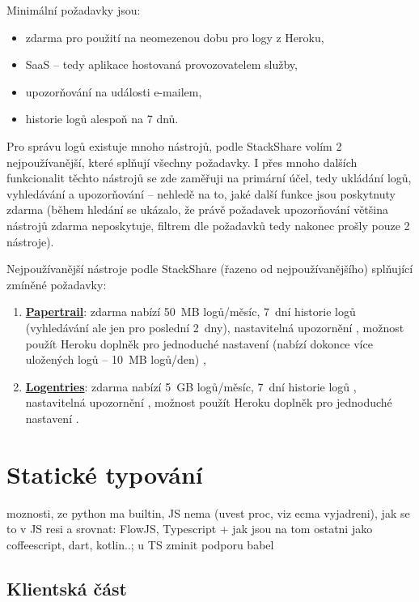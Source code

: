 Minimální požadavky jsou:
\begin{itemize}
    \item zdarma pro použití na neomezenou dobu pro logy z Heroku,
    \item SaaS -- tedy aplikace hostovaná provozovatelem služby,
    \item upozorňování na události e-mailem,
    \item historie logů alespoň na 7 dnů.
\end{itemize}

Pro správu logů existuje mnoho nástrojů, podle StackShare \cite{stackshare-log} volím 2 nejpoužívanější, které splňují všechny požadavky. I přes mnoho dalších funkcionalit těchto nástrojů se zde zaměřuji na primární účel, tedy ukládání logů, vyhledávání a upozorňování -- nehledě na to, jaké další funkce jsou poskytnuty zdarma (během hledání se ukázalo, že právě požadavek upozorňování většina nástrojů zdarma neposkytuje, filtrem dle požadavků tedy nakonec prošly pouze 2 nástroje).

Nejpoužívanější nástroje podle StackShare (řazeno od nejpoužívanějšího) \cite{stackshare-log} splňující zmíněné požadavky:
\begin{enumerate}
    \item \href{https://www.papertrail.com/}{\textbf{Papertrail}}: zdarma nabízí 50~MB logů/měsíc, 7~dní historie logů (vyhledávání ale jen pro poslední 2~dny), nastavitelná upozornění \cite{papertrail-pricing}, možnost použít Heroku doplněk pro jednoduché nastavení (nabízí dokonce více uložených logů -- 10~MB logů/den) \cite{heroku-papertrail},
    \item \href{https://logentries.com/}{\textbf{Logentries}}: zdarma nabízí 5~GB logů/měsíc, 7~dní historie logů \cite{logentries-pricing}, nastavitelná upozornění \cite{logentries-pricing2}, možnost použít Heroku doplněk pro jednoduché nastavení \cite{heroku-logentries}.
\end{enumerate}


\section{Statické typování}
moznosti, ze python ma builtin, JS nema (uvest proc, viz ecma vyjadreni), jak se to v JS resi a srovnat: FlowJS, Typescript + jak jsou na tom ostatni jako coffeescript, dart, kotlin..; u TS zminit podporu babel

\subsection{Klientská část}


